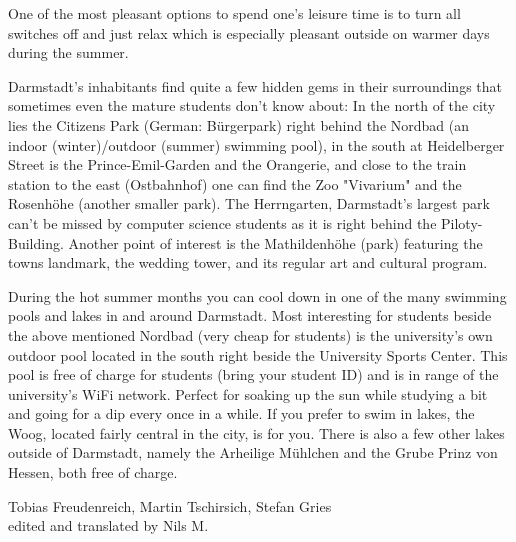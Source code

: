 {One of the most pleasant options to spend one's leisure time is to turn all switches off and just relax which is especially pleasant outside on warmer days during the summer.
}{
Darmstadt's inhabitants find quite a few hidden gems in their surroundings that sometimes even the mature students don't know about: In the north of the city lies the Citizens Park (German: Bürgerpark) right behind the Nordbad (an indoor (winter)/outdoor (summer) swimming pool), in the south at Heidelberger Street is the Prince-Emil-Garden and the Orangerie, and close to the train station to the east (Ostbahnhof) one can find the Zoo "Vivarium" and the Rosenhöhe (another smaller park).
The Herrngarten, Darmstadt's largest park can't be missed by computer science students as it is right behind the Piloty-Building. Another point of interest is the Mathildenhöhe (park) featuring the towns landmark, the wedding tower, and its regular art and cultural program.

During the hot summer months you can cool down in one of the many swimming pools and lakes in and around Darmstadt. Most interesting for students beside the above mentioned Nordbad (very cheap for students) is the university's own outdoor pool located in the south right beside the University Sports Center. This pool is free of charge for students (bring your student ID) and is in range of the university's WiFi network. Perfect for soaking up the sun while studying a bit and going for a dip every once in a while.
If you prefer to swim in lakes, the Woog, located fairly central in the city, is for you. There is also a few other lakes outside of Darmstadt, namely the Arheilige Mühlchen and the Grube Prinz von Hessen, both free of charge.
}
{Tobias Freudenreich, Martin Tschirsich, Stefan Gries \\ edited and translated by Nils M.}
\newpage